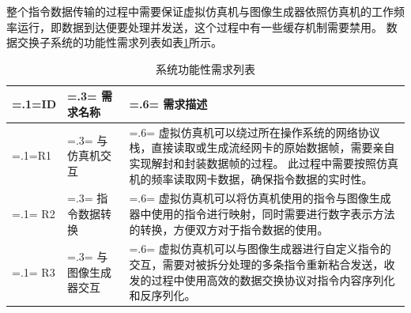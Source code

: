 \par
整个指令数据传输的过程中需要保证虚拟仿真机与图像生成器依照仿真机的工作频率运行，即数据到达便要处理并发送，这个过程中有一些缓存机制需要禁用。
数据交换子系统的功能性需求列表如表\ref{funcreq}所示。
\begin{table}[h!]
    \begin{center}
        \caption{系统功能性需求列表}
        \label{funcreq}
        \renewcommand\arraystretch{1.5}
        \begin{tabularx}{\textwidth}{ 
            | >{\centering\arraybackslash\hsize=.1\hsize\linewidth=\hsize}X 
            | >{\centering\arraybackslash\hsize=.3\hsize\linewidth=\hsize}X 
            | >{\raggedright\arraybackslash\hsize=.6\hsize\linewidth=\hsize}X 
            | }
            \hline
            \textbf{ID} & \textbf{需求名称} & \textbf{需求描述}\\
            \hline
            R1 & 与仿真机交互 & 虚拟仿真机可以绕过所在操作系统的网络协议栈，直接读取或生成流经网卡的原始数据帧，需要亲自实现解封和封装数据帧的过程。
                               此过程中需要按照仿真机的频率读取网卡数据，确保指令数据的实时性。\\
            \hline
            R2 & 指令数据转换 & 虚拟仿真机可以将仿真机使用的指令与图像生成器中使用的指令进行映射，同时需要进行数字表示方法的转换，方便双方对于指令数据的使用。\\
            \hline 
            R3 & 与图像生成器交互 & 虚拟仿真机可以与图像生成器进行自定义指令的交互，需要对被拆分处理的多条指令重新粘合发送，收发的过程中使用高效的数据交换协议对指令内容序列化和反序列化。\\
            \hline
        \end{tabularx}
    \end{center}
\end{table}


